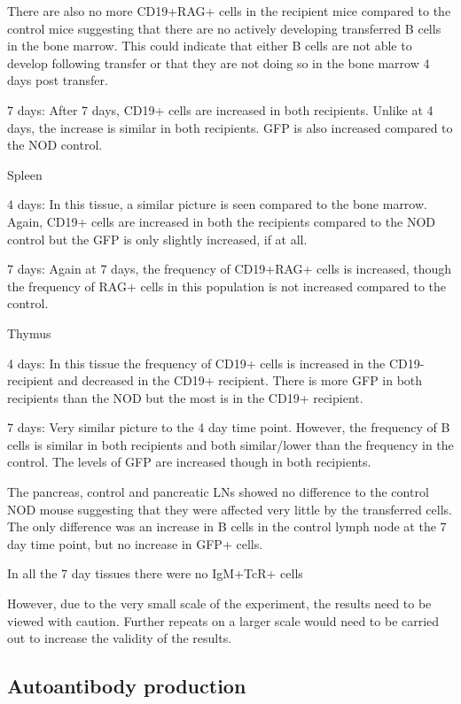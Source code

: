 There are also no more CD19+RAG+ cells in the recipient mice compared to the control mice suggesting that there are no actively developing transferred B cells in the bone marrow.
This could indicate that either B cells are not able to develop following transfer or that they are not doing so in the bone marrow 4 days post transfer.

7 days:
After 7 days, CD19+ cells are increased in both recipients. 
Unlike at 4 days, the increase is similar in both recipients.
GFP is also increased compared to the NOD control.

Spleen

4 days:
In this tissue, a similar picture is seen compared to the bone marrow. 
Again, CD19+ cells are increased in both the recipients compared to the NOD control but the GFP is only slightly increased, if at all.

7 days:
Again at 7 days, the frequency of CD19+RAG+ cells is increased, though the frequency of RAG+ cells in this population is not increased compared to the control.


Thymus

4 days:
In this tissue the frequency of CD19+ cells is increased in the CD19- recipient and decreased in the CD19+ recipient.
There is more GFP in both recipients than the NOD but the most is in the CD19+ recipient.

7 days:
Very similar picture to the 4 day time point.
However, the frequency of B cells is similar in both recipients and both similar/lower than the frequency in the control.
The levels of GFP are increased though in both recipients.


The pancreas, control and pancreatic LNs showed no difference to the control NOD mouse suggesting that they were affected very little by the transferred cells. 
The only difference was an increase in B cells in the control lymph node at the 7 day time point, but no increase in GFP+ cells.

In all the 7 day tissues there were no IgM+TcR+ cells



However, due to the very small scale of the experiment, the results need to be viewed with caution.
Further repeats on a larger scale would need to be carried out to increase the validity of the results.

\subsection{Autoantibody production}

